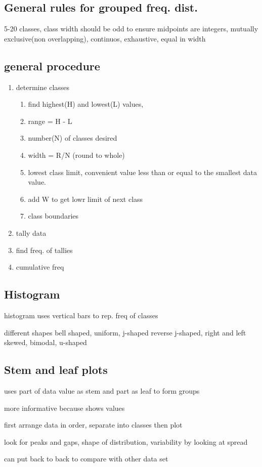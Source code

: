 \documentclass[11pt]{amsart}
\begin{document}
\subsection{General rules for grouped freq. dist.}
\par 5-20 classes, class width should be odd to ensure midpoints are
integers, mutually exclusive(non overlapping), continuos, exhaustive,
equal in width
\subsection{general procedure}
\begin{enumerate}
  \item determine classes
    \begin{enumerate}
      \item find highest(H) and lowest(L) values,
      \item range = H - L
      \item number(N) of classes desired
      \item width =  R/N (round to whole)
      \item lowest class limit, convenient value less than or equal to the
        smallest data value.
      \item add W to get lowr limit of next class
      \item class boundaries
    \end{enumerate}
  \item tally data
  \item find freq. of tallies
  \item cumulative freq
\end{enumerate}
\subsection{Histogram}
\par histogram uses vertical bars to rep. freq of classes
\par different shapes bell shaped, uniform, j-shaped
reverse j-shaped, right and left skewed, bimodal, u-shaped
\subsection{Stem and leaf plots}
\par uses part of data value as stem and part as leaf to form groups
\par more informative because shows values
\par first arrange data in order, separate into classes then plot
\par look for peaks and gaps, shape of distribution, variability by looking
at spread
\par can put back to back to compare with other data set
\end{document}
